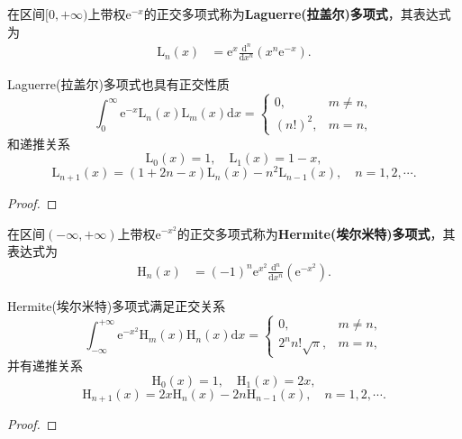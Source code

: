 \documentclass[../../main.tex]{subfiles}
\begin{document}
\begin{definition}
在区间$[0,+\infty)$上带权$\mathrm{e}^{-x}$的正交多项式称为\textbf{Laguerre(拉盖尔)多项式}，其表达式为
\begin{align}\label{eq:数值分析-3-2.17}
\mathrm{L}_n(x) &= \mathrm{e}^x \frac{\mathrm{d}^n}{\mathrm{d}x^n}(x^n \mathrm{e}^{-x}).
\end{align}
\end{definition}

\begin{theorem}
Laguerre(拉盖尔)多项式也具有正交性质
$$\int_0^\infty \mathrm{e}^{-x}\mathrm{L}_n(x)\mathrm{L}_m(x)\mathrm{d}x =
\begin{cases}
0, & m \neq n, \\
(n!)^2, & m = n,
\end{cases}$$
和递推关系
$$\mathrm{L}_0(x) = 1,\quad \mathrm{L}_1(x) = 1 - x,$$
$$\mathrm{L}_{n+1}(x) = (1 + 2n - x)\mathrm{L}_n(x) - n^2\mathrm{L}_{n-1}(x),\quad n = 1,2,\cdots.$$
\end{theorem}
\begin{proof}

\end{proof}

\begin{definition}
在区间$(-\infty,+\infty)$上带权$\mathrm{e}^{-x^2}$的正交多项式称为\textbf{Hermite(埃尔米特)多项式}，其表达式为
\begin{align}\label{eq:数值分析-3-2.18}
\mathrm{H}_n(x) &= (-1)^n \mathrm{e}^{x^2} \frac{\mathrm{d}^n}{\mathrm{d}x^n}(\mathrm{e}^{-x^2}).
\end{align}
\end{definition}

\begin{theorem}
Hermite(埃尔米特)多项式满足正交关系
$$\int_{-\infty}^{+\infty} \mathrm{e}^{-x^2}\mathrm{H}_m(x)\mathrm{H}_n(x)\mathrm{d}x =
\begin{cases}
0, & m \neq n, \\
2^n n! \sqrt{\pi}, & m = n,
\end{cases}$$
并有递推关系
$$\mathrm{H}_0(x) = 1,\quad \mathrm{H}_1(x) = 2x,$$
$$\mathrm{H}_{n+1}(x) = 2x\mathrm{H}_n(x) - 2n\mathrm{H}_{n-1}(x),\quad n = 1,2,\cdots.$$
\end{theorem}
\begin{proof}

\end{proof}
\end{document}
